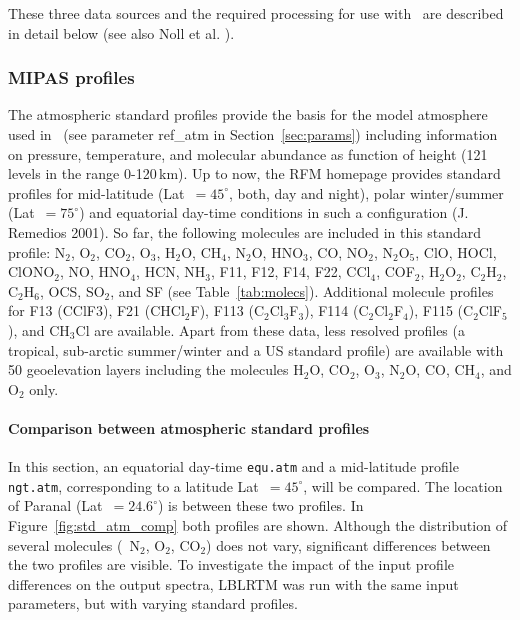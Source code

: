 These three data sources and the required processing for use with \mf\ are
described in detail below (see also Noll et al. \cite{NOL12}).

\subsubsection{MIPAS profiles}\label{sec:mipas}
The atmospheric standard profiles provide the basis for the model atmosphere
used in \mf\ (see parameter {\sc ref\_atm} in Section~\ref{sec:params})
including information on pressure, temperature, and molecular abundance as
function of height (121 levels in the range 0-120\,km). Up to now, the
\ac{RFM} homepage \cite{RFM} provides standard profiles for mid-latitude
(Lat~$ = 45^\circ$, both, day and night), polar winter/summer (Lat~$ = 75^\circ$)
and equatorial day-time conditions in such a configuration (J. Remedios 2001).
So far, the following molecules are included in this standard profile: N$_2$,
O$_2$, CO$_2$, O$_3$, H$_2$O, CH$_4$, N$_2$O, HNO$_3$, CO, NO$_2$, N$_2$O$_5$,
ClO, HOCl, ClONO$_2$, NO, HNO$_4$, HCN, NH$_3$, F11, F12, F14, F22, CCl$_4$,
COF$_2$, H$_2$O$_2$, C$_2$H$_2$, C$_2$H$_6$, OCS, SO$_2$, and SF (see
Table~\ref{tab:molecs}). Additional molecule profiles for F13 (CClF3), F21
(CHCl$_2$F), F113 (C$_2$Cl$_3$F$_3$), F114 (C$_2$Cl$_2$F$_4$), F115
(C$_2$ClF$_5$), and CH$_3$Cl are available. Apart from these data, less
resolved profiles (a tropical, sub-arctic summer/winter and a US standard
profile) are available with 50 geoelevation layers including the molecules
H$_2$O, CO$_2$, O$_3$, N$_2$O, CO, CH$_4$, and O$_2$ only.

\paragraph*{Comparison between atmospheric standard profiles}
\label{sec:results_std_profiles}
In this section, an equatorial day-time \verb|equ.atm| and a mid-latitude
profile \verb|ngt.atm|, corresponding to a latitude Lat~$= 45^\circ$, will
be compared. The location of Paranal (Lat~$= 24.6^\circ$) is between these two
profiles. In Figure~\ref{fig:std_atm_comp} both profiles are shown. Although
the distribution of several molecules (\eg\ N$_2$, O$_2$, CO$_2$) does not
vary, significant differences between the two profiles are visible. To
investigate the impact of the input profile differences on the output spectra,
\ac{LBLRTM} was run with the same input parameters, but with varying standard
profiles.

